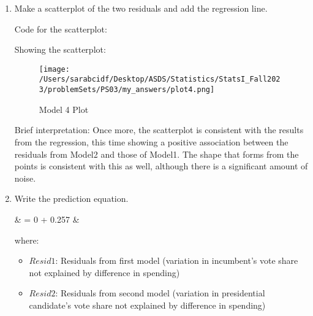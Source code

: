 \documentclass[12pt,letterpaper]{article}
\begin{document}
\begin{enumerate}
		\item Make a scatterplot of the two residuals and add the regression line. 	\vspace{.25cm}
		
		Code for the scatterplot: 
		
		
		Showing the scatterplot: 
		\begin{figure}[H]
			\centering
			\texttt{[image: /Users/sarabcidf/Desktop/ASDS/Statistics/StatsI\_Fall2023/problemSets/PS03/my\_answers/plot4.png]}
			\caption{Model 4 Plot}
		\end{figure}
		
		Brief interpretation: 
		Once more, the scatterplot is consistent with the results from the regression, this time showing a positive association between the residuals from Model2 and those of Model1. The shape that forms from the points is consistent with this as well, although there is a significant amount of noise. 
		
		\item Write the prediction equation.
		
		{\setlength{\abovedisplayskip}{2pt} 
			\setlength{\belowdisplayskip}{6pt} 
			
			\begin{flalign*}
				& = 0 + 0.257 \cdot {}  &
			\end{flalign*}
			
			where: 
			
			\begin{itemize}
				\item $Resid1$: Residuals from first model (variation in incumbent's vote share not explained by difference in spending)
				\item $Resid2$: Residuals from second model (variation in presidential candidate's vote share not explained by difference in spending)
			\end{itemize}
		}
		
	\end{enumerate}
	
	\newpage	
\end{document}
